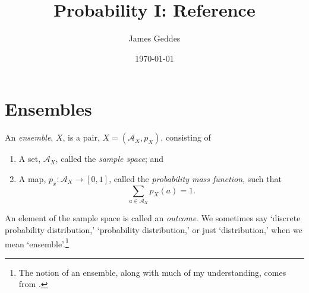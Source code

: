 \documentclass[10pt, a4paper, twocolumn]{article}
\author{James Geddes}
\date{\today}
\title{Probability I: Reference}
\begin{document}
\maketitle
%
\section*{Ensembles}
An \emph{ensemble}, $X$, is a pair, $X = (\mathcal{A}_X, p_X)$, consisting of
\begin{enumerate}
\item A set, $\mathcal{A}_X$, called the \emph{sample space}; and
\item A map, $p_x:\mathcal{A}_X \to [0, 1]$, called the \emph{probability mass
function}, such that
  \[
  \sum_{a \in \mathcal{A}_X} p_X(a) = 1.
  \]
\end{enumerate}
An element of the sample space is called an \emph{outcome}. We sometimes say
`discrete probability distribution,' `probability distribution,' or just
`distribution,' when we mean `ensemble'.\footnote{The notion of an ensemble,
along with much of my understanding, comes from
\textcite{mackay2003information}.}
\end{document}
